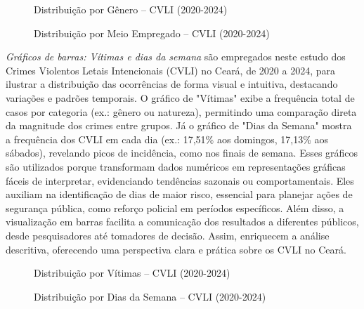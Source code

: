 \documentclass{exam}
\begin{document}
\begin{questions}
\begin{figure}[H]
    \centering
    
    \caption{Distribuição por Gênero -- CVLI (2020-2024)}
    \label{fig:grafico_genero}
\end{figure}

\begin{figure}[H]
    \centering
    
    \caption{Distribuição por Meio Empregado -- CVLI (2020-2024)}
    \label{fig:grafico_meio}
\end{figure}

\question 
\textit{Gráficos de barras: Vítimas e dias da semana} são empregados neste estudo dos Crimes Violentos Letais Intencionais (CVLI) no Ceará, de 2020 a 2024, para ilustrar a distribuição das ocorrências de forma visual e intuitiva, destacando variações e padrões temporais. O gráfico de "Vítimas" exibe a frequência total de casos por categoria (ex.: gênero ou natureza), permitindo uma comparação direta da magnitude dos crimes entre grupos. Já o gráfico de "Dias da Semana" mostra a frequência dos CVLI em cada dia (ex.: 17,51\% aos domingos, 17,13\% aos sábados), revelando picos de incidência, como nos finais de semana. Esses gráficos são utilizados porque transformam dados numéricos em representações gráficas fáceis de interpretar, evidenciando tendências sazonais ou comportamentais. Eles auxiliam na identificação de dias de maior risco, essencial para planejar ações de segurança pública, como reforço policial em períodos específicos. Além disso, a visualização em barras facilita a comunicação dos resultados a diferentes públicos, desde pesquisadores até tomadores de decisão. Assim, enriquecem a análise descritiva, oferecendo uma perspectiva clara e prática sobre os CVLI no Ceará.

\begin{figure}[H]
    \centering
    
    \caption{Distribuição por Vítimas -- CVLI (2020-2024)}
    \label{fig:grafico_vitimas}
\end{figure}

\begin{figure}[H]
    \centering
    
    \caption{Distribuição por Dias da Semana -- CVLI (2020-2024)}
    \label{fig:grafico_dia_semana}
\end{figure}


\end{questions}
\end{document}
